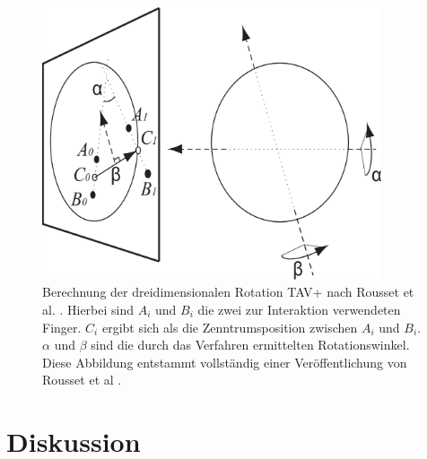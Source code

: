 \begin{figure}
	\begin{center}
		\includegraphics[width=10cm]{img/tav_plus.pdf}
	\end{center}
	\caption{Berechnung der dreidimensionalen Rotation TAV+ nach Rousset et al. \cite{rousset:2014}. Hierbei sind $A_i$ und $B_i$ die zwei zur Interaktion verwendeten Finger. $C_i$ ergibt sich als die Zenntrumsposition zwischen $A_i$ und $B_i$. $\alpha$ und $\beta$ sind die durch das Verfahren ermittelten Rotationswinkel. Diese Abbildung entstammt vollständig einer Veröffentlichung von Rousset et al \cite{rousset:2014}.}
	\label{fig:tav_plus}
\end{figure}


\section{Diskussion}
\label{sec:diskussion_interaktion}

